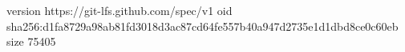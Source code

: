 version https://git-lfs.github.com/spec/v1
oid sha256:d1fa8729a98ab81fd3018d3ac87cd64fe557b40a947d2735e1d1dbd8ce0c60eb
size 75405
